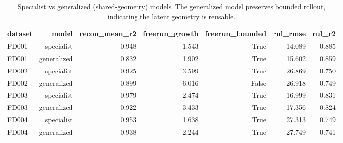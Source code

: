 \begin{table}[t]
\centering
\caption{Specialist vs generalized (shared-geometry) models. The generalized model preserves bounded rollout, indicating the latent geometry is reusable.}
\label{tab:specialist_vs_generalized}
\begin{tabular}{lrrrrrr}
\toprule
dataset & model & recon\_mean\_r2 & freerun\_growth & freerun\_bounded & rul\_rmse & rul\_r2 \\
\midrule
FD001 & specialist & 0.948 & 1.543 & True & 14.089 & 0.885 \\
FD001 & generalized & 0.832 & 1.902 & True & 15.602 & 0.859 \\
FD002 & specialist & 0.925 & 3.599 & True & 26.869 & 0.750 \\
FD002 & generalized & 0.899 & 6.016 & False & 26.918 & 0.749 \\
FD003 & specialist & 0.979 & 2.474 & True & 16.999 & 0.831 \\
FD003 & generalized & 0.922 & 3.433 & True & 17.356 & 0.824 \\
FD004 & specialist & 0.953 & 1.638 & True & 27.313 & 0.749 \\
FD004 & generalized & 0.938 & 2.244 & True & 27.749 & 0.741 \\
\bottomrule
\end{tabular}
\end{table}